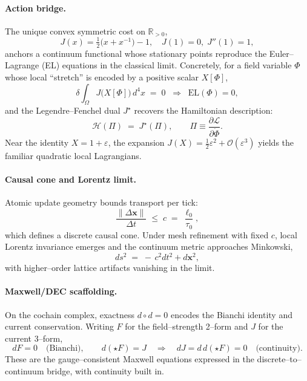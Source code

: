 \documentclass[11pt]{article}
\begin{document}
\paragraph{Action bridge.}
The unique convex symmetric cost on \(\mathbb{R}_{>0}\),
\[
  J(x)=\tfrac12\!\bigl(x+x^{-1}\bigr)-1,\quad J(1)=0,\; J''(1)=1,
\]
anchors a continuum functional whose stationary points reproduce the Euler–Lagrange (EL) equations in the classical limit. Concretely, for a field variable \(\Phi\) whose local “stretch” is encoded by a positive scalar \(X[\Phi]\),
\begin{equation}
  \delta \!\int_{\Omega} J\!\bigl(X[\Phi]\bigr)\, d^4x \;=\; 0
  \;\;\Longrightarrow\;\; \mathrm{EL}(\Phi)=0,
\end{equation}
and the Legendre–Fenchel dual \(J^\star\) recovers the Hamiltonian description:
\begin{equation}
  \mathcal{H}(\Pi) \;=\; J^\star(\Pi),\qquad 
  \Pi \equiv \frac{\partial \mathcal{L}}{\partial \dot{\Phi}}.
\end{equation}
Near the identity \(X=1+\varepsilon\), the expansion \(J(X)=\tfrac12\varepsilon^2+\mathcal{O}(\varepsilon^3)\) yields the familiar quadratic local Lagrangians.

\paragraph{Causal cone and Lorentz limit.}
Atomic update geometry bounds transport per tick:
\begin{equation}
  \frac{\|\Delta \mathbf{x}\|}{\Delta t} \;\le\; c \;=\; \frac{\ell_0}{\tau_0},
\end{equation}
which defines a discrete causal cone. Under mesh refinement with fixed \(c\), local Lorentz invariance emerges and the continuum metric approaches Minkowski,
\begin{equation}
  ds^2 \;=\; -\,c^2 dt^2 + d\mathbf{x}^2,
\end{equation}
with higher–order lattice artifacts vanishing in the limit.

\paragraph{Maxwell/DEC scaffolding.}
On the cochain complex, exactness \(d\!\circ d=0\) encodes the Bianchi identity and current conservation. Writing \(F\) for the field–strength 2–form and \(J\) for the current 3–form,
\begin{equation}
  dF = 0 \quad\text{(Bianchi)},\qquad
  d(\star F) = J \quad\Rightarrow\quad dJ = d\,d(\star F) = 0 \quad\text{(continuity)}.
\end{equation}
These are the gauge–consistent Maxwell equations expressed in the discrete–to–continuum bridge, with continuity built in.
\end{document}
